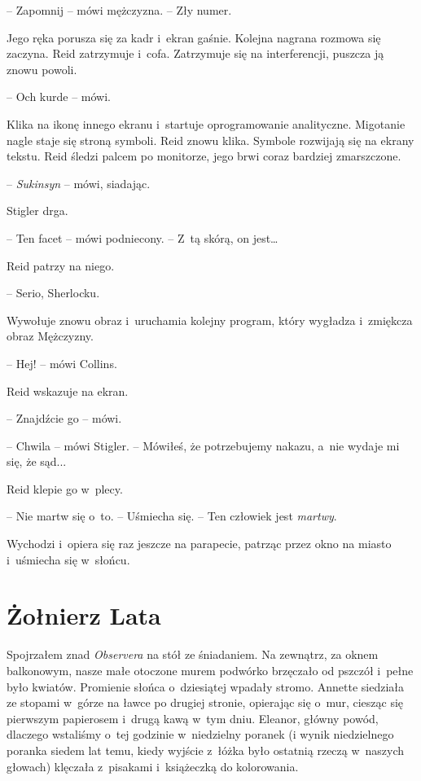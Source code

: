 \documentclass[oneside,polish,11pt,sfheadings]{mwbk}
\begin{document}
-- Zapomnij -- mówi mężczyzna. -- Zły numer.

Jego ręka porusza się za kadr i~ekran gaśnie. Kolejna nagrana rozmowa
się zaczyna. Reid zatrzymuje i~cofa. Zatrzymuje się na interferencji,
puszcza ją znowu powoli.

-- Och kurde -- mówi.

Klika na ikonę innego ekranu i~startuje oprogramowanie analityczne.
Migotanie nagle staje się stroną symboli. Reid znowu klika. Symbole
rozwijają się na ekrany tekstu. Reid śledzi palcem po monitorze, jego
brwi coraz bardziej zmarszczone.

-- \emph{Sukinsyn} -- mówi, siadając.

Stigler drga. 

-- Ten facet -- mówi podniecony. -- Z~tą skórą, on jest\ldots

Reid patrzy na niego. 

-- Serio, Sherlocku.

Wywołuje znowu obraz i~uruchamia kolejny program, który wygładza i~zmiękcza obraz Mężczyzny.

-- Hej! -- mówi Collins.

Reid wskazuje na ekran. 

-- Znajdźcie go -- mówi.

-- Chwila -- mówi Stigler. -- Mówiłeś, że potrzebujemy nakazu, a~nie wydaje
mi się, że sąd...

Reid klepie go w~plecy. 

-- Nie martw się o~to. -- Uśmiecha się. -- Ten
człowiek jest \emph{martwy}.

Wychodzi i~opiera się raz jeszcze na parapecie, patrząc przez okno na
miasto i~uśmiecha się w~słońcu.

\chapter{Żołnierz Lata}

Spojrzałem znad \emph{Observera} na stół ze śniadaniem. Na zewnątrz, za
oknem balkonowym, nasze małe otoczone murem podwórko brzęczało od
pszczół i~pełne było kwiatów. Promienie słońca o~dziesiątej wpadały
stromo. Annette siedziała ze stopami w~górze na ławce po drugiej
stronie, opierając się o~mur, ciesząc się pierwszym papierosem i~drugą
kawą w~tym dniu. Eleanor, główny powód, dlaczego wstaliśmy o~tej
godzinie w~niedzielny poranek (i wynik niedzielnego poranka siedem lat
temu, kiedy wyjście z~łóżka było ostatnią rzeczą w~naszych głowach)
klęczała z~pisakami i~książeczką do kolorowania.
\end{document}
